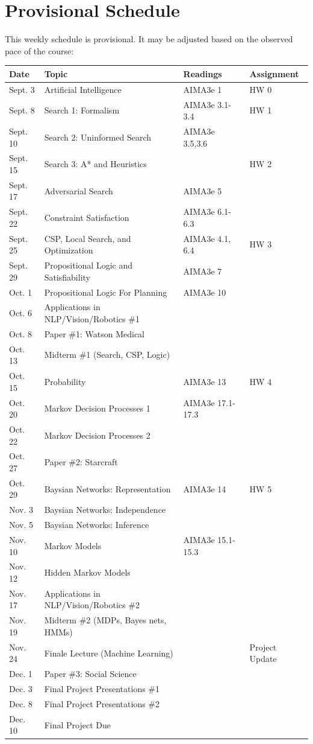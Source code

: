 \documentclass[11pt]{article}
\begin{document}
\section{Provisional Schedule}

This weekly schedule is provisional. It may be adjusted based on the observed pace of the course:
\vspace {0.25cm}

 \begin{center}
\begin{tabular}{llll}
\toprule
Date &Topic &Readings &Assignment \\
\midrule
 Sept. 3 & Artificial Intelligence  & AIMA3e 1 &HW 0 \\
 Sept. 8 &Search 1: Formalism & AIMA3e 3.1-3.4  &HW 1 \\
 Sept. 10 & Search 2: Uninformed Search  & AIMA3e 3.5,3.6 & \\
 Sept. 15 & Search 3: A* and Heuristics & &HW 2 \\
 Sept. 17 &Adversarial Search &AIMA3e 5 & \\
 Sept. 22 &Constraint Satisfaction &AIMA3e 6.1-6.3 & \\
 Sept. 25 &CSP, Local Search, and Optimization &AIMA3e 4.1, 6.4 &HW 3 \\
 Sept. 29 &Propositional Logic and Satisfiability &AIMA3e 7 & \\
 Oct. 1 & Propositional Logic For Planning  & AIMA3e 10 & \\
 Oct. 6 &Applications in NLP/Vision/Robotics \#1 & & \\
 Oct. 8 & Paper \#1: Watson Medical  & & \\
 Oct. 13 &Midterm \#1 (Search, CSP, Logic) & & \\
 Oct. 15 & Probability  & AIMA3e 13  &HW 4 \\
 Oct. 20 & Markov Decision Processes 1 &AIMA3e 17.1-17.3 & \\
 Oct. 22 & Markov Decision Processes 2  & & \\
 Oct. 27 & Paper \#2: Starcraft  & & \\
 Oct. 29 & Baysian Networks: Representation &AIMA3e 14 &HW 5 \\
 Nov. 3 & Baysian Networks: Independence & & \\
 Nov. 5 & Baysian Networks: Inference & & \\
 Nov. 10 & Markov Models &AIMA3e 15.1-15.3 & \\
 Nov. 12 & Hidden Markov Models & & \\
 Nov. 17 & Applications in NLP/Vision/Robotics \#2  & & \\
 Nov. 19 & Midterm \#2 (MDPs, Bayes nets, HMMs)  & & \\
 Nov. 24 & Finale Lecture (Machine Learning)  && Project Update \\
 Dec. 1 & Paper \#3: Social Science  & & \\
 Dec. 3 & Final Project Presentations \#1  & & \\
 Dec. 8 & Final Project Presentations \#2 & & \\
 Dec. 10 & Final Project Due  & &\\
\bottomrule
\end{tabular}
 \end{center}
\end{document}
